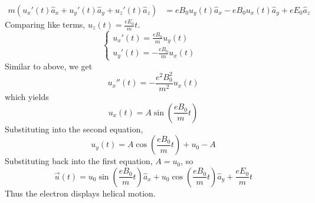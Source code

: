 \documentclass[answers]{exam}
\begin{document}
\begin{questions}
\begin{solution}
\begin{align*}
        m(u_x'(t)\hat a_x + u_y'(t)\hat a_y + u_z'(t)\hat a_z) &= eB_0u_y(t) \hat a_x - eB_0u_x(t) \hat a_y + eE_0\hat a_z
    \end{align*}
    Comparing like terms, $u_z(t) = \frac{eE_0}{m}t$.
    $$\begin{cases} u_x'(t) = \frac{eB_0}{m} u_y(t) & \\ u_y'(t) = -\frac{eB_0}{m} u_x(t) & \end{cases}$$
    Similar to above, we get
    $$u_x''(t) = -\frac{e^2B_0^2}{m^2} u_x(t)$$
    which yields
    $$u_x(t) = A\sin\left(\frac{eB_0}{m}t\right)$$
    Substituting into the second equation,
    $$u_y(t) = A\cos\left(\frac{eB_0}{m}t\right) + u_0 - A$$
    Substituting back into the first equation, $A = u_0$, so
    $$\vec u(t) = u_0\sin\left(\frac{eB_0}{m}t\right) \hat a_x + u_0\cos\left(\frac{eB_0}{m}t\right) \hat a_y + \frac{eE_0}{m}t$$
    Thus the electron displays helical motion.
\end{solution}



\end{questions}
\end{document}
